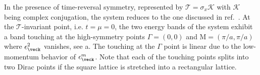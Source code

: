 In the presence of time-reversal symmetry, represented by $\mathcal{T}=\sigma_x \mathcal{K}$ with $\mathcal{K}$ being complex conjugation, the system reduces to the one discussed in ref.~\cite{Syzranov2014}.
At the $\mathcal{T}$-invariant point, i.e. $t=\mu=0$, the two energy bands of the system exhibit a band touching at the high-symmetry points $\Gamma=(0,0)$ and $\text{M}=(\pi/a, \pi/a)$ where $\epsilon^2_\veck$ vanishes, see a.
The touching at the $\Gamma$ point is linear due to the low-momentum behavior of $\epsilon^m_\veck$.
Note that each of the touching points splits into two Dirac points if the square lattice is stretched into a rectangular lattice.


